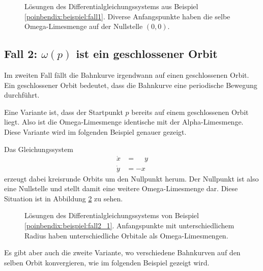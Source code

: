 \begin{figure}
    \centering
    
    \caption{Lösungen des Differentialgleichungssystems aus Beispiel \ref{poinbendix:beispiel:fall1}.
    Diverse Anfangspunkte haben die selbe Omega-Limesmenge auf der Nullstelle $(0,0)$.}
    \label{poinbendix:fig:fixed_point_omega_set}
\end{figure}

\subsection{Fall 2: $\omega(p)$ ist ein geschlossener Orbit} \label{poinbendix:subsection:fall2}

Im zweiten Fall fällt die Bahnkurve irgendwann auf einen geschlossenen Orbit.
Ein geschlossener Orbit bedeutet, dass die Bahnkurve eine periodische Bewegung durchführt.

Eine Variante ist, dass der Startpunkt $p$ bereits auf einem geschlossenen Orbit liegt.
Also ist die Omega-Limesmenge identische mit der Alpha-Limesmenge.
Diese Variante wird im folgenden Beispiel genauer gezeigt.


\begin{beispiel} \label{poinbendix:beispiel:fall2_1}
Das Gleichungssystem
\begin{align*}
    \dot{x} &= \phantom{-}y \\
    \dot{y} &= -x
\end{align*}
erzeugt dabei kreisrunde Orbits um den Nullpunkt herum.
Der Nullpunkt ist also eine Nullstelle und stellt damit eine weitere Omega-Limesmenge dar.
Diese Situation ist in Abbildung \ref{poinbendix:fig:fall_2} zu sehen.
\end{beispiel}

\begin{figure}
\centering
    
    \caption{Lösungen des Differentialgleichungssystems von Beispiel \ref{poinbendix:beispiel:fall2_1}.
    Anfangspunkte mit unterschiedlichem Radius haben unterschiedliche Orbitale als Omega-Limesmengen.}
\label{poinbendix:fig:fall_2}
\end{figure}

Es gibt aber auch die zweite Variante, wo verschiedene Bahnkurven auf den selben Orbit konvergieren, wie im folgenden Beispiel gezeigt wird.

